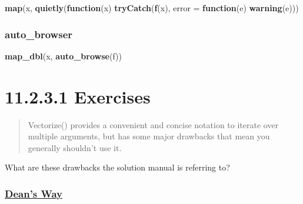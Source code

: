 \documentclass[]{book}
\newenvironment{Shaded}{\begin{snugshade}}{\end{snugshade}}
\newcommand{\ControlFlowTok}[1]{\textcolor[rgb]{0.13,0.29,0.53}{\textbf{#1}}}
\newcommand{\DataTypeTok}[1]{\textcolor[rgb]{0.13,0.29,0.53}{#1}}
\newcommand{\KeywordTok}[1]{\textcolor[rgb]{0.13,0.29,0.53}{\textbf{#1}}}
\newcommand{\NormalTok}[1]{#1}
\begin{document}
\begin{Shaded}
\begin{Highlighting}[]
\KeywordTok{map}\NormalTok{(x, }\KeywordTok{quietly}\NormalTok{(}\ControlFlowTok{function}\NormalTok{(x) }\KeywordTok{tryCatch}\NormalTok{(}\KeywordTok{f}\NormalTok{(x), }\DataTypeTok{error =} \ControlFlowTok{function}\NormalTok{(e) }\KeywordTok{warning}\NormalTok{(e)))}
\end{Highlighting}
\end{Shaded}

\hypertarget{auto_browser}{%
\subsubsection*{auto\_browser}\label{auto_browser}}

\begin{Shaded}
\begin{Highlighting}[]
\KeywordTok{map_dbl}\NormalTok{(x, }\KeywordTok{auto_browse}\NormalTok{(f))}
\end{Highlighting}
\end{Shaded}

\hypertarget{exercises-9}{%
\section*{11.2.3.1 Exercises}\label{exercises-9}}

\begin{quote}
Vectorize() provides a convenient and concise notation to iterate over multiple arguments, but has some major drawbacks that mean you generally shouldn't use it.
\end{quote}

What are these drawbacks the solution manual is referring to?

\hypertarget{deans-way}{%
\subsubsection{\texorpdfstring{\href{https://deanattali.com/blog/mutate-non-vectorized/}{Dean's Way}}{Dean's Way}}\label{deans-way}}
\end{document}
